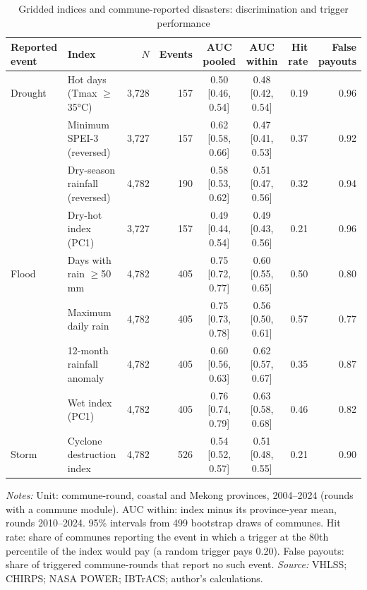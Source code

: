 \documentclass[11pt,a4paper]{article}
\begin{document}
\begin{table}[htbp]
\centering\footnotesize
\setlength{\tabcolsep}{3.5pt}
\caption{Gridded indices and commune-reported disasters: discrimination and trigger performance}
\label{tab:auc}
\begin{tabular}{@{}llrrccrr@{}}
\toprule
Reported event & Index & $N$ & Events & AUC pooled & AUC within & Hit rate & False payouts \\
\midrule
Drought & Hot days (Tmax $\geq$35°C) & 3,728 & 157 & 0.50 [0.46, 0.54] & 0.48 [0.42, 0.54] & 0.19 & 0.96 \\
 & Minimum SPEI-3 (reversed) & 3,727 & 157 & 0.62 [0.58, 0.66] & 0.47 [0.41, 0.53] & 0.37 & 0.92 \\
 & Dry-season rainfall (reversed) & 4,782 & 190 & 0.58 [0.53, 0.62] & 0.51 [0.47, 0.56] & 0.32 & 0.94 \\
 & Dry-hot index (PC1) & 3,727 & 157 & 0.49 [0.44, 0.54] & 0.49 [0.43, 0.56] & 0.21 & 0.96 \\
\midrule
Flood & Days with rain $\geq$50 mm & 4,782 & 405 & 0.75 [0.72, 0.77] & 0.60 [0.55, 0.65] & 0.50 & 0.80 \\
 & Maximum daily rain & 4,782 & 405 & 0.75 [0.73, 0.78] & 0.56 [0.50, 0.61] & 0.57 & 0.77 \\
 & 12-month rainfall anomaly & 4,782 & 405 & 0.60 [0.56, 0.63] & 0.62 [0.57, 0.67] & 0.35 & 0.87 \\
 & Wet index (PC1) & 4,782 & 405 & 0.76 [0.74, 0.79] & 0.63 [0.58, 0.68] & 0.46 & 0.82 \\
\midrule
Storm & Cyclone destruction index & 4,782 & 526 & 0.54 [0.52, 0.57] & 0.51 [0.48, 0.55] & 0.21 & 0.90 \\
\bottomrule
\end{tabular}
\begin{minipage}{\textwidth}\footnotesize
\textit{Notes:} Unit: commune-round, coastal and Mekong provinces, 2004--2024 (rounds with a commune module). AUC within: index minus its province-year mean, rounds 2010--2024. 95\% intervals from 499 bootstrap draws of communes. Hit rate: share of communes reporting the event in which a trigger at the 80th percentile of the index would pay (a random trigger pays 0.20). False payouts: share of triggered commune-rounds that report no such event. \textit{Source:} VHLSS; CHIRPS; NASA POWER; IBTrACS; author's calculations.
\end{minipage}
\end{table}
\end{document}
